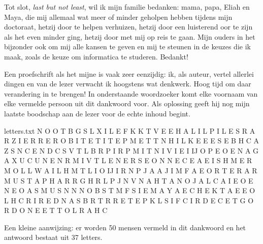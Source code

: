 \documentclass[main]{subfiles}
\begin{document}
Tot slot, \textit{last but not least}, wil ik mijn familie bedanken: mama, papa, Eliah en Maya, die mij allemaal wat meer of minder geholpen hebben tijdens mijn doctoraat, hetzij door te helpen verhuizen, hetzij door een luisterend oor te zijn als het even minder ging, hetzij door met mij op reis te gaan.
Mijn ouders in het bijzonder ook om mij alle kansen te geven en mij te steunen in de keuzes die ik maak, zoals de keuze om informatica te studeren.
Bedankt!

\pagebreak

Een proefschrift als het mijne is vaak zeer eenzijdig: ik, als auteur, vertel allerlei dingen en van de lezer verwacht ik hoogstens wat denkwerk.
Hoog tijd om daar verandering in te brengen!
In onderstaande woordzoeker komt elke voornaam van elke vermelde persoon uit dit dankwoord voor.
Als oplossing geeft hij nog mijn laatste boodschap aan de lezer voor de echte inhoud begint.

\begin{filecontents*}{letters.txt}
N O O T B G S L X I L E F K K T V
E E H A L I L P I L E S R A R Z I
E R R E R O B I T E T I T E P M E
T T N H I L K E E E S E B H C A Z
S N C E N D C S V T L B R P I R P
M I T N I V I E I IJ O P E O E N A
G A X U C U N E N R M I V T L E N
E R S E O N N E C E A E I S H M E
R M O L L W A I L H M T L I O IJ I
R N P J A A J I M F A E O R T E R
A R M U S T A P H A R R G H R L P
J N V N A H T A N O J A L C A I E
O E N E O A S M U S N N N O B S T
M F S I E M A Y A E C H E K T A E
E O L H C R I R E D N A S B R T R
R E T E P K L S I F C I R D E C E
T G O R D O N E E T T O L R A H C
\end{filecontents*}

\readarray*{}

\vspace{\fill}

\begin{wide}
\end{wide}

{\small Een kleine aanwijzing: er worden 50 mensen vermeld in dit dankwoord en het antwoord bestaat uit 37 letters.}



\end{document}
